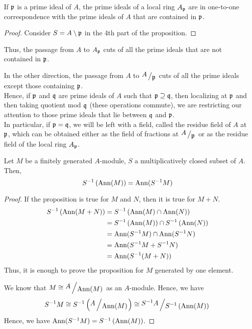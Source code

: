 \begin{corollary}{}{}
	If \(\mathfrak{p}\) is a prime ideal of \(A\), the prime ideals of a local ring
	\(A_{\mathfrak{p}}\) are in one-to-one correspondence with the prime ideals of
	\(A\) that are contained in \(\mathfrak{p}\).
\end{corollary}
\begin{proof}
	Consider \(S = A \setminus \mathfrak{p}\) in the 4th part of the proposition.
\end{proof}

\begin{note}{}{}
\label{note:3_localization_of_prime_ideals}
	Thus, the passage from \(A\) to \(A_{\mathfrak{p}}\) cuts of all
	the prime ideals that are not contained in \(\mathfrak{p}\).

	In the other direction, the passage from \(A\) to
	\(\bigslant{A}{\mfp}\) cuts of all the prime ideals
	except those containing \(\mathfrak{p}\). \\

	Hence, if \(\mathfrak{p}\) and \(\mathfrak{q}\) are prime ideals of \(A\) such that
	\(\mathfrak{p} \supseteq \mathfrak{q}\), then localizing at \(\mathfrak{p}\) and then
	taking quotient mod \(\mathfrak{q}\) (these operations commute), we are
	restricting our attention to those prime ideals that
	lie between \(\mathfrak{q}\) and \(\mathfrak{p}\). \\

	In particular, if \(\mathfrak{p} = \mathfrak{q}\), we will be left with a field,
	called the residue field of \(A\) at \(\mathfrak{p}\), which can be obtained
	either as the field of fractions at \(\bigslant{A}{\mfp}\) or as
	the residue field of the local ring \(A_{\mathfrak{p}}\).
\end{note}


\begin{proposition}{}{}
\label{prop:3_16}
	Let \(M\) be a finitely generated \(A\)-module, \(S\) a multiplicatively
	closed subset of \(A\).
	Then,
	\[
		S^{-1} \left( \operatorname{Ann}(M) \right) = \operatorname{Ann}(S^{-1}M)
	\]
\end{proposition}
\begin{proof}
	If the proposition is true for \(M\) and \(N\), then it is true for
	\(M + N\).
	\begin{align*}
		S^{-1} \left( \operatorname{Ann}(M + N) \right) &= S^{-1} \left( \operatorname{Ann}(M) \cap \operatorname{Ann}(N) \right) \\
		&= S^{-1} \left( \operatorname{Ann}(M) \right) \cap S^{-1} \left( \operatorname{Ann}(N) \right) \\
		&= \operatorname{Ann}(S^{-1}M) \cap \operatorname{Ann}(S^{-1}N) \\
		&= \operatorname{Ann}(S^{-1}M + S^{-1}N) \\
		&= \operatorname{Ann}(S^{-1}(M + N))
	\end{align*}
	Thus, it is enough to prove the proposition for \(M\) generated by
	one element.

	We know that \(M \cong \bigslant{A}{\Ann(M)}\) as an \(A\)-module.
	Hence, we have
	\[
		S^{-1}M \cong S^{-1} \brak{\bigslant{A}{\Ann(M)}}
		\cong \bigslant{S^{-1}A}{S^{-1} \brak{\Ann(M)}}
	\]
	Hence, we have \(\operatorname{Ann}(S^{-1}M) = S^{-1} \left( \operatorname{Ann}(M) \right)\).
\end{proof}

